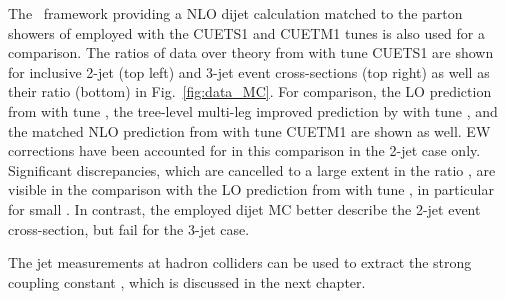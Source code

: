The \POWHEG~framework providing a NLO dijet calculation matched to the parton showers of \PYTHIAE employed with the CUETS1 and CUETM1 tunes \cite{Khachatryan:2015pea} is also used for a comparison. The ratios of data over theory from \POWHEGn \plusn \PYTHIAE with tune CUETS1 are shown for inclusive 2-jet (top left) and 3-jet event cross-sections (top right) as well as their ratio \ratio (bottom) in Fig.~\ref{fig:data_MC}. For comparison, the LO prediction from \PYTHIAS with tune \Ztwostar, the tree-level multi-leg improved prediction by \MadGraphFn \plusn \PYTHIAS with tune \Ztwostar, and the matched NLO prediction from \POWHEGn \plusn \PYTHIAE with tune CUETM1 are shown as well. EW corrections have been accounted for in this comparison in the 2-jet case only. Significant discrepancies, which are cancelled to a large extent in the ratio \ratio, are visible in the comparison with the LO prediction from \MadGraphFn \plusn \PYTHIAS with tune \Ztwostar, in particular for small \httwo. In contrast, the employed dijet MC \POWHEGn \plusn \PYTHIAE better describe the 2-jet event cross-section, but fail for the 3-jet case.

The jet measurements at hadron colliders can be used to extract the strong coupling constant \alps, which is discussed in the next chapter.


